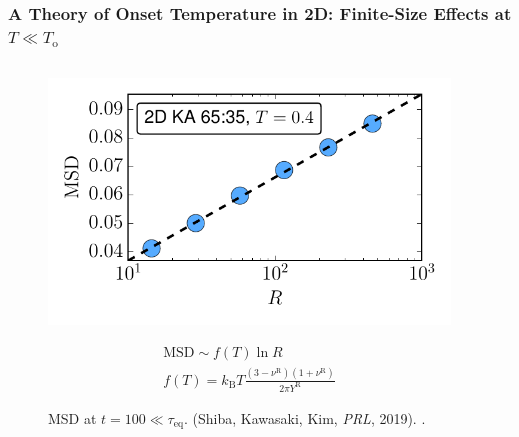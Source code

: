 \begin{frame}[c]
\frametitle{A Theory of Onset Temperature in 2D: Finite-Size Effects at $T \ll T_\mathrm{o}$
} %

\begin{columns}[T]

\begin{column}[T]{0.5\linewidth}

\begin{figure}
\includegraphics[height=0.5\textheight]{c.10-kt_merminwagner_1/merminwagner_comparison_0.pdf}
\caption{MSD at $t=100 \ll \tau_\mathrm{eq}$. (Shiba, Kawasaki, Kim, \textit{PRL}, 2019).  .}
\vspace{-20pt}
\begin{gather*}
    \mathrm{MSD} \sim f(T) \ln R
    \\
    f(T) = k_{\mathrm{B}} T \frac{\left(3-\nu^{\mathrm{R}}\right)\left(1+\nu^{\mathrm{R}}\right)}{2 \pi Y^{\mathrm{R}}}
\end{gather*}
    
\end{figure}
\end{column}

\begin{column}[T]{0.5\linewidth}


\end{column}
\end{columns}
\end{frame}

